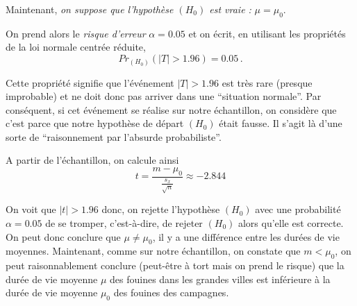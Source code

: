 \documentclass[12pt, a4paper]{book}
\numberwithin{equation}{section}
\begin{document}
\begin{center}
\end{center}




Maintenant, {\it on suppose que l'hypothèse $(H_0)$ est vraie :} $\mu = \mu_0$. 

On prend alors le {\it risque d'erreur} $\alpha=0.05$ et on écrit, en 
utilisant les propriétés de la loi normale centrée réduite,
$$
Pr_{(H_0)}(|T|>1.96)=0.05\,.
$$

Cette propriété signifie que l'événement $|T|>1.96$ est très rare (presque improbable) et ne doit donc pas 
arriver dans une ``situation normale''. Par conséquent, si cet événement se réalise sur notre échantillon, on considère que c'est parce que notre hypothèse de départ $(H_0)$ était fausse. Il s'agit là d'une sorte de 
``raisonnement par l'absurde probabiliste''. 

A partir de l'échantillon, on calcule ainsi
$$
t=\frac{m-\mu_0}{\frac{s_x}{\sqrt{n}}} \approx -2.844
$$

On voit que $|t|>1.96$ donc, on rejette l'hypothèse $(H_0)$ avec une probabilité $\alpha=0.05$ de se tromper, 
c'est-à-dire, de rejeter $(H_0)$ alors qu'elle est correcte.
On peut donc conclure que $\mu\neq\mu_0$, il y a une différence entre les durées de vie moyennes. 
Maintenant, comme sur notre échantillon, on constate que $m<\mu_0$, on peut raisonnablement conclure
(peut-être à tort mais on prend le risque) que la durée de vie moyenne $\mu$ des fouines dans les grandes 
villes est inférieure à la durée de vie moyenne $\mu_0$ des fouines des campagnes.\\
\end{document}
